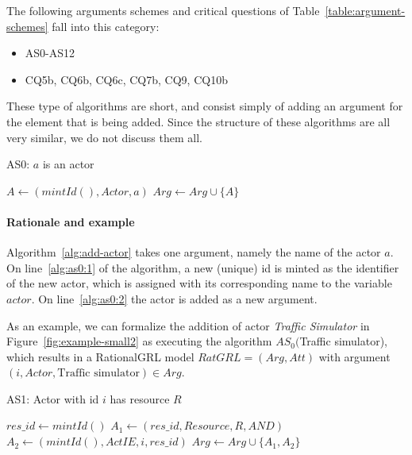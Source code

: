 The following arguments schemes and critical questions of Table~\ref{table:argument-schemes} fall into this category:
\begin{itemize}
\item AS0-AS12
\item CQ5b, CQ6b, CQ6c, CQ7b, CQ9, CQ10b
\end{itemize}

These type of algorithms are short, and consist simply of adding an argument for the element that is being added. Since the structure of these algorithms are all very similar, we do not discuss them all. 

\begin{algorithm}[h]
  \caption{AS0: $a$ is an actor}\label{alg:add-actor}
  \begin{algorithmic}[1]
    \State $A \leftarrow (mintId(), Actor, a)$ \label{alg:as0:1}
    \State $Arg\leftarrow Arg \cup \{A\}$\label{alg:as0:2}
    \EndProcedure
  \end{algorithmic}
\end{algorithm}

\paragraph{Rationale and example} Algorithm~\ref{alg:add-actor} takes one argument, namely the name of the actor $a$. On line~\ref{alg:as0:1} of the algorithm, a new (unique) id is minted as the identifier of the new actor, which is assigned with its corresponding name to the variable $actor$. On line~\ref{alg:as0:2} the actor is added as a new argument.

As an example, we can formalize the addition of actor \emph{Traffic Simulator} in Figure~\ref{fig:example-small2} as executing the algorithm $AS_0($Traffic simulator), which results in a RationalGRL model $RatGRL=(Arg,Att)$ with argument $(i, Actor, \text{Traffic simulator})\in Arg$.


\begin{algorithm}[h]
  \caption{AS1: Actor with id $i$ has resource $R$}\label{alg:add-resource}
  \begin{algorithmic}[1]
    \State $res\_id\gets mintId()$\label{alg:add-resource:id}
    \State $A_1\leftarrow (res\_id, Resource, R, AND)$\label{alg:add-resource:arg1}
    \State $A_2\leftarrow (mintId(),ActIE, i, res\_id)$\label{alg:add-resource:arg2}
    \State $Arg\gets Arg\cup \{A_1,A_2\}$\label{alg:add-resource:add-arg}
    \EndProcedure
  \end{algorithmic}
\end{algorithm}


